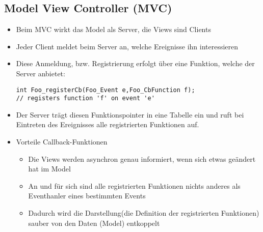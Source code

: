 \subsection{Model View Controller (MVC) }
\begin{itemize}
	\item Beim MVC wirkt das Model als Server, die Views sind Clients
	\item Jeder Client meldet beim Server an, welche Ereignisse ihn interessieren
	\item Diese Anmeldung, bzw. Registrierung erfolgt über eine Funktion, welche der Server anbietet:
	\begin{lstlisting}[style=C]
int Foo_registerCb(Foo_Event e,Foo_CbFunction f);
// registers function 'f' on event 'e'
	\end{lstlisting}
	\item Der Server trägt diesen Funktionspointer in eine Tabelle ein und ruft bei Eintreten des Ereignisses alle registrierten Funktionen auf.
	\item Vorteile Callback-Funktionen
	\begin{itemize}
		\item Die Views werden asynchron genau informiert, wenn sich etwas geändert hat im Model
		\item An und für sich sind alle registrierten Funktionen nichts anderes als Eventhanler eines bestimmten Events
		\item Dadurch wird die Darstellung(die Definition der registrierten Funktionen) sauber von den Daten (Model) entkoppelt
	\end{itemize} 
\end{itemize}
